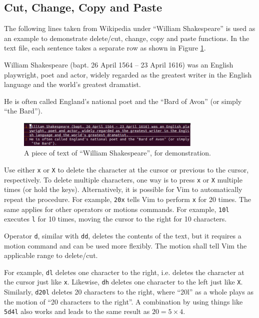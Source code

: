 \subsection{Cut, Change, Copy and Paste}

The following lines taken from Wikipedia under ``William Shakespeare'' is used as an example to demonstrate delete/cut, change, copy and paste functions. In the text file, each sentence takes a separate row as shown in Figure \ref{ch:tfe:fig:vimdemo1}.

\begin{shortbox}
William Shakespeare (bapt. 26 April 1564 – 23 April 1616) was an English playwright, poet and actor, widely regarded as the greatest writer in the English language and the world's greatest dramatist.

He is often called England's national poet and the ``Bard of Avon'' (or simply ``the Bard'').
\end{shortbox}

\begin{figure}[htbp]
\centering
\includegraphics[width=250pt]{chapters/part-1/figures/vimdemo1.png}
\caption{A piece of text of ``William Shakespeare'', for demonstration.} \label{ch:tfe:fig:vimdemo1}
\end{figure}

Use either \verb|x| or \verb|X| to delete the character at the cursor or previous to the cursor, respectively. To delete multiple characters, one way is to press \verb|x| or \verb|X| multiple times (or hold the keys). Alternatively, it is possible for Vim to automatically repeat the procedure. For example, \verb|20x| tells Vim to perform \verb|x| for 20 times. The same applies for other operators or motions commands. For example, \verb|10l| executes \verb|l| for 10 times, moving the cursor to the right for 10 characters.

Operator \verb|d|, similar with \verb|dd|, deletes the contents of the text, but it requires a motion command and can be used more flexibly. The motion shall tell Vim the applicable range to delete/cut.

For example, \verb|dl| deletes one character to the right, i.e. deletes the character at the cursor just like \verb|x|. Likewise, \verb|dh| deletes one character to the left just like \verb|X|. Similarly, \verb|d20l| deletes 20 characters to the right, where ``20l'' as a whole plays as the motion of ``20 characters to the right''. A combination by using things like \verb|5d4l| also works and leads to the same result as $20=5\times 4$.

